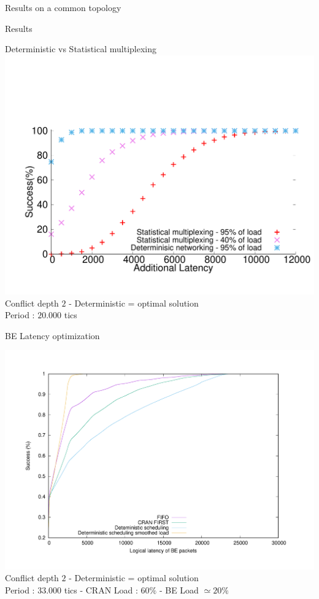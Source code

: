 \documentclass[10 pt]{beamer}
\begin{document}
\begin{section}{Results on a common topology}
\begin{subsection}{Results}

  
    \begin{frame}{Deterministic vs Statistical multiplexing}
\centering
\vspace{-2cm}
  \includegraphics[scale=0.4]{stochastic.pdf}\\
  
  Conflict depth $2$ - Deterministic = optimal solution\\
  Period : $20.000$ tics 
  \end{frame}
  
      \begin{frame}{BE Latency optimization}
\centering

  \includegraphics[scale=0.3]{res.pdf}\\
  
   Conflict depth $2$ - Deterministic = optimal solution\\
  Period : $33.000$ tics - CRAN Load : $60\%$ - BE Load $\simeq 20\%$
  \end{frame}

\end{subsection}


\end{section}
\end{document}
